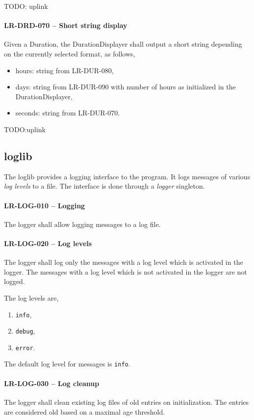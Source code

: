 TODO: uplink
\paragraph{LR-DRD-070 -- Short string display}
Given a Duration, the DurationDisplayer shall output a short string depending
on the currently selected format, as follows,
\begin{itemize}
\item hours: string from LR-DUR-080,
\item days: string from LR-DUR-090 with number of hours as initialized in the
            DurationDisplayer,
\item seconds: string from LR-DUR-070.
\end{itemize}

TODO:uplink
\subsection{log\textunderscore lib}
The log\textunderscore lib provides a logging interface to the program.
It logs messages of various \emph{log levels} to a file. The interface
is done through a \emph{logger} singleton.

\paragraph{LR-LOG-010 -- Logging}
The logger shall allow logging messages to a log file.

\paragraph{LR-LOG-020 -- Log levels}
The logger shall log only the messages with a log level which is
activated in the logger. The messages with a log level which is
not activated in the logger are not logged.

The log levels are,
\begin{enumerate}
\item \lstinline{info},
\item \lstinline{debug},
\item \lstinline{error}.
\end{enumerate}

The default log level for messages is \lstinline{info}.

\paragraph{LR-LOG-030 -- Log cleanup}
The logger shall clean existing log files of old entries on initialization.
The entries are considered old based on a maximal age threshold.

